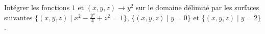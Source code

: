 
\begin{exercice}\label{exoIntMult0013}

Intégrer les fonctions $1$ et $(x,y,z)\rightarrow y^2$ sur le domaine délimité par les surfaces suivantes $\{(x,y,z) \mid x^2-\frac{y^4}{4} + z^2 =1 \}$, $\{(x,y,z) \mid y=0 \}$ et $\{(x,y,z) \mid y=2 \}$.

\end{exercice}

